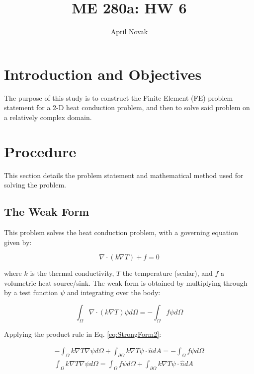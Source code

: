\documentclass[10pt]{article}
\begin{document}
\title{ME 280a: HW 6}
\author{April Novak}

\maketitle

\section{Introduction and Objectives}

The purpose of this study is to construct the Finite Element (FE) problem statement for a 2-D heat conduction problem, and then to solve said problem on a relatively complex domain.

\section{Procedure}
\label{sec:Procedure}

This section details the problem statement and mathematical method used for solving the problem.

\subsection{The Weak Form}

This problem solves the heat conduction problem, with a governing equation given by:

\begin{equation}
\nabla\cdot(k\nabla T)+f=0
\end{equation}

where \(k\) is the thermal conductivity, \(T\) the temperature (scalar), and \(f\) a volumetric heat source/sink. The weak form is obtained by multiplying through by a test function \(\psi\) and integrating over the body:

\begin{equation}
\label{eq:StrongForm2}
\int_{\Omega}\nabla\cdot(k\nabla T)\psi d\Omega=-\int_{\Omega}f\psi d\Omega
\end{equation}

Applying the product rule in Eq. \eqref{eq:StrongForm2}:

\begin{equation}
\begin{aligned}
-\int_{\Omega}k\nabla T\nabla\psi d\Omega+\int_{\partial\Omega}k\nabla T\psi\cdot\hat{n}dA=-\int_{\Omega}f\psi d\Omega\\
\int_{\Omega}k\nabla T\nabla\psi d\Omega=\int_{\Omega}f\psi d\Omega+\int_{\partial\Omega}k\nabla T\psi\cdot\hat{n}dA\\
\end{aligned}
\end{equation}
\end{document}
